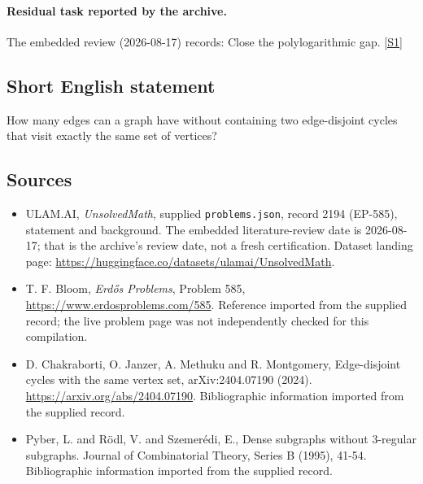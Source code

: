 \documentclass[11pt,a4paper]{article}
\newcommand{\sref}[2]{\hyperlink{source:#1:#2}{[S#2]}}
\begin{document}
\paragraph{Residual task reported by the archive.}

The embedded review (2026-08-17) records: Close the polylogarithmic gap. \sref{2194}{1}

\subsection{Short English statement}

How many edges can a graph have without containing two edge-disjoint cycles that visit exactly the same set of vertices?

\subsection{Sources}

{\small

\begin{itemize}

\item[\hypertarget{source:2194:1}{S1}] ULAM.AI, \emph{UnsolvedMath}, supplied \texttt{problems.json}, record 2194 (EP-585), statement and background. The embedded literature-review date is 2026-08-17; that is the archive’s review date, not a fresh certification. Dataset landing page: \url{https://huggingface.co/datasets/ulamai/UnsolvedMath}.

\item[\hypertarget{source:2194:2}{S2}] T. F. Bloom, \emph{Erdős Problems}, Problem 585, \url{https://www.erdosproblems.com/585}. Reference imported from the supplied record; the live problem page was not independently checked for this compilation.

\item[\hypertarget{source:2194:3}{S3}] D. Chakraborti, O. Janzer, A. Methuku and R. Montgomery, Edge-disjoint cycles with the same vertex set, arXiv:2404.07190 (2024). \url{https://arxiv.org/abs/2404.07190}. Bibliographic information imported from the supplied record.

\item[\hypertarget{source:2194:4}{S4}] Pyber, L. and R\"{o}dl, V. and Szemer\'{e}di, E., Dense subgraphs without 3-regular subgraphs. Journal of Combinatorial Theory, Series B (1995), 41-54. Bibliographic information imported from the supplied record.

\end{itemize}

}

\label{end:2194}
\end{document}

